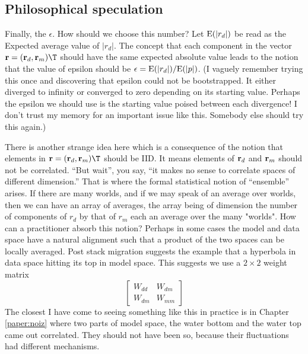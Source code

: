 \subsection{Philosophical speculation}
\par
Finally, the $\epsilon$.  How should we choose this number?
Let ${\rm E}(|r_d|)$ be read as the Expected average value of $|r_d|$.
The concept that each component in the vector $\bold r = (\bold r_d,\bold r_m)\T$
should have the same expected absolute value leads to the notion that
the value of epsilon should be
$\epsilon={\rm E}(|r_d|)/{\rm E}(|p|)$.
(I vaguely remember trying this once and discovering that epsilon
could not be bootstrapped.  It either diverged to infinity
or converged to zero depending on its starting value.
Perhaps the epsilon we should use is the starting value poised between each divergence!
I don't trust my memory for an important issue like this.
Somebody else should try this again.)

\par
There is another strange idea here which is a consequence
of the notion that elements in  $\bold r = (\bold r_d,\bold r_m)\T$
should be IID.
It means elements of $\bold r_d$ and $\bold r_m$ should not be correlated.
``But wait'', you say, ``it makes no sense to correlate spaces of different dimension.''
That is where the formal statistical notion of ``ensemble'' arises.
If there are many worlds, and if we may speak of an average over worlds,
then we can have an array of averages,
the array being of dimension the number of components of $r_d$ by that of $r_m$
each an average over the many "worlds".
How can a practitioner absorb this notion?
Perhaps in some cases the model and data space have a natural alignment
such that a product of the two spaces can be locally averaged.
Post stack migration suggests the example
that a hyperbola in data space hitting its top in model space.
This suggests we use a $2\times 2$ weight matrix
\begin{equation}
\left[
\begin{array}{cc}
	W_{dd}  &  W_{dm}
	\\
	W_{dm}  &  W_{mm}
\end{array}
\right]
\end{equation}
The closest I have come to seeing something like this in practice is in
Chapter \ref{paper:noiz}
where two parts of model space,
the water bottom and the water top
came out correlated.
They should not have been so,
because their fluctuations had different mechanisms.


